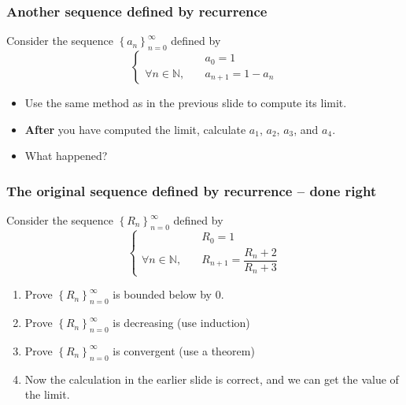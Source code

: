 \begin{frame}[t]
	\frametitle{Another sequence defined by recurrence}
	Consider the sequence $\displaystyle \left\{ a_{n} \right\}_{n=0}^{\infty}$ defined
	by
	\begin{equation*}
		\begin{cases}
			                                & a_{0}= 1           \\
			\forall n \in \mathbb{N}, \quad & a_{n+1}= 1 - a_{n}
		\end{cases}
	\end{equation*}

	\begin{itemize}
		\item Use the same method as in the previous slide to compute its limit.

		\item {\bfseries After} you have computed the limit, calculate $a_{1}$, $a_{2}$,
			$a_{3}$, and $a_{4}$.

		\item What happened?
	\end{itemize}
\end{frame}

\begin{frame}[t]
	\frametitle{The original sequence defined by recurrence -- done right}

	Consider the sequence $\displaystyle \left\{ R_{n} \right\}_{n=0}^{\infty}$
	defined by
	\begin{equation*}
		\begin{cases}
			                                & R_{0}= 1                           \\
			\forall n \in \mathbb{N}, \quad & R_{n+1}= \dfrac{ R_n + 2}{R_n + 3}
		\end{cases}
	\end{equation*}

	\begin{enumerate}
		\item Prove $\displaystyle \left\{ R_{n} \right\}_{n=0}^{\infty}$ is bounded
			below by 0.

		\item Prove $\displaystyle \left\{ R_{n} \right\}_{n=0}^{\infty}$ is decreasing
			(use induction)

		\item Prove $\displaystyle \left\{ R_{n} \right\}_{n=0}^{\infty}$ is convergent
			(use a theorem)

		\item Now the calculation in the earlier slide is correct, and we can get
			the value of the limit.
	\end{enumerate}
\end{frame}

